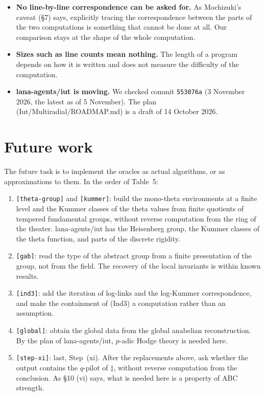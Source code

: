 \documentclass[11pt,a4paper]{article}
\newcommand{\leanus}{\textunderscore\allowbreak}
\newcommand{\lean}[1]{{\ttfamily\let\_\leanus #1}}
\newcommand{\orc}[1]{\texttt{[#1]}}
\newcommand{\lab}[2]{{\upshape\fcolorbox{#1}{#1!8}{\scriptsize\sffamily\bfseries\textcolor{#1}{#2}}}}
\newcommand{\tagH}{\lab{BurntOrange}{H}}
\begin{document}
\begin{itemize}
relational verification are not formally applied in this note. The check of non-interference is also a test of one
hidden choice (the coordinates on $\Delta_\Theta$).
\item \textbf{No line-by-line correspondence can be asked for.} As Mochizuki's caveat (\S7) says, explicitly tracing the
correspondence between the parts of the two computations is something that cannot be done at all. Our comparison stays
at the shape of the whole computation.
\item \textbf{Sizes such as line counts mean nothing.} The length of a program depends on how it is written and does not
measure the difficulty of the computation.
\item \textbf{lana-agents/iut is moving.} We checked commit \texttt{553076a} (3 November 2026, the latest as of 5
November). The plan (\lean{Iut/\allowbreak{}Multiradial/\allowbreak{}ROADMAP.md}) is a draft of 14 October 2026.
\end{itemize}

\section{Future work}
\tagH{} The future task is to implement the oracles as actual algorithms, or as approximations to them. In the order of
Table~5:
\begin{enumerate}
\item \orc{theta-group} and \orc{kummer}: build the mono-theta environments at a finite level and the Kummer classes of
the theta values from finite quotients of tempered fundamental groups, without reverse computation from the ring of the
theater. lana-agents/iut has the Heisenberg group, the Kummer classes of the theta function, and parts of the discrete
rigidity.
\item \orc{gab}: read the type of the abstract group from a finite presentation of the group, not from the field. The
recovery of the local invariants is within known results.
\item \orc{ind3}: add the iteration of log-links and the log-Kummer correspondence, and make the containment of (Ind3) a
computation rather than an assumption.
\item \orc{global}: obtain the global data from the global anabelian reconstruction. By the plan of lana-agents/iut,
$p$-adic Hodge theory is needed here.
\item \orc{step-xi}: last, Step~(xi). After the replacements above, ask whether the output contains the $q$-pilot of
$\ddagger$, without reverse computation from the conclusion. As \S10 (vi) says, what is needed here is a property of ABC
strength.
\end{enumerate}
\end{document}
